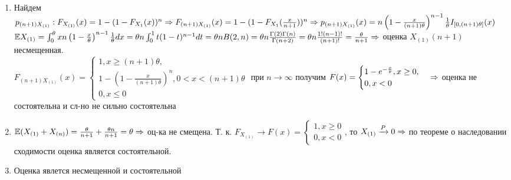 {\begin{enumerate}
    \item Найдем $p_{(n + 1)X_{(1)}}: F_{X_{(1)}}(x) = 1 - (1 - F_{X_1}(x))^n \Rightarrow F_{(n + 1)X_{(1)}}(x) =  1 - (1 - F_{X_1}(\frac{x}{n + 1}))^n \Rightarrow p_{(n + 1)X_{(1)}}(x) = n\left(1 - \frac{x}{(n + 1)\theta}\right)^{n - 1} \frac{1}{\theta}I_{[0, (n + 1)\theta]}(x)$ \\
    $\mathbb{E} X_{(1)} = \int_{0}^{\theta}xn\left(1 - \frac{x}{\theta}\right)^{n - 1}\frac{1}{\theta}dx = \theta n\int_{0}^{1}t(1 - t)^{n - 1}dt = \theta nB(2, n) = \theta n\frac{\Gamma(2)\Gamma(n)}{\Gamma(n + 2)} = \theta n\frac{1!(n - 1)!}{(n + 1)!} = \frac{\theta}{n + 1} \Rightarrow $ оценка $X_{(1)}(n + 1) $ несмещенная. \\
    $F_{(n + 1)X_{(1)}}(x) = 
    \begin{cases}
     1, x \ge (n + 1)\theta, \\
     1 - \left(1 - \frac{x}{(n + 1)\theta}\right)^n, 0 < x < (n + 1)\theta \\
     0, x \le 0
    \end{cases}
    $ при $n \to \infty$ получим $
    F(x) =
    \begin{cases}
    1 - e^{-\frac{x}{\theta}}, x \ge 0, \\
    0, x < 0
    \end{cases} \Rightarrow 
    $ оценка не состоятельна и сл-но не сильно состоятельна
    \item $\mathbb{E} (X_{(1)} + X_{(n)}) = \frac{\theta}{n + 1} + \frac{\theta n}{n + 1} = \theta \Rightarrow $ оц-ка не смещена.
    Т. к. $F_{X_{(1)}} \to F(x) = 
    \begin{cases}
    1, x \ge 0 \\
    0, x < 0
    \end{cases}
    $, то $X_{(1)} \xrightarrow[]{P} 0 \Rightarrow$ по теореме о наследовании сходимости оценка является состоятельной. 
    \item Оценка явлется несмещенной и состоятельной
  \end{enumerate}
}
